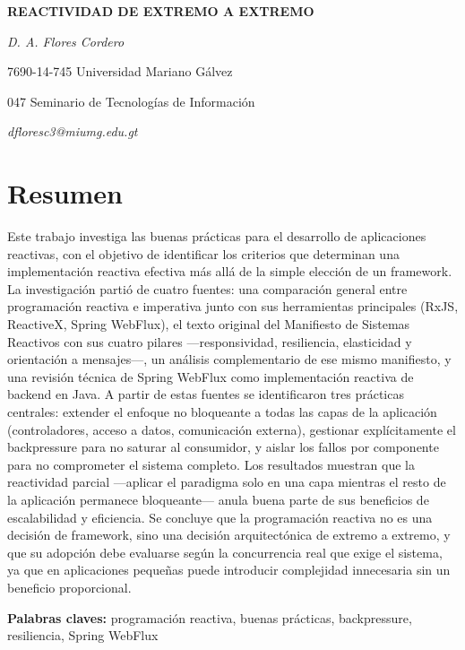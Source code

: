 \documentclass[
  spanish,
  12pt,
  letterpaper,
]{article}
\author{}
\date{}
\begin{document}
\begin{center}

\textbf{REACTIVIDAD DE EXTREMO A EXTREMO}

\emph{D. A. Flores Cordero}

7690-14-745 Universidad Mariano Gálvez

047 Seminario de Tecnologías de Información

\emph{dfloresc3@miumg.edu.gt}

\end{center}

\section{Resumen}\label{resumen}

Este trabajo investiga las buenas prácticas para el desarrollo de
aplicaciones reactivas, con el objetivo de identificar los criterios que
determinan una implementación reactiva efectiva más allá de la simple
elección de un framework. La investigación partió de cuatro fuentes: una
comparación general entre programación reactiva e imperativa junto con
sus herramientas principales (RxJS, ReactiveX, Spring WebFlux), el texto
original del Manifiesto de Sistemas Reactivos con sus cuatro pilares
---responsividad, resiliencia, elasticidad y orientación a mensajes---,
un análisis complementario de ese mismo manifiesto, y una revisión
técnica de Spring WebFlux como implementación reactiva de backend en
Java. A partir de estas fuentes se identificaron tres prácticas
centrales: extender el enfoque no bloqueante a todas las capas de la
aplicación (controladores, acceso a datos, comunicación externa),
gestionar explícitamente el backpressure para no saturar al consumidor,
y aislar los fallos por componente para no comprometer el sistema
completo. Los resultados muestran que la reactividad parcial ---aplicar
el paradigma solo en una capa mientras el resto de la aplicación
permanece bloqueante--- anula buena parte de sus beneficios de
escalabilidad y eficiencia. Se concluye que la programación reactiva no
es una decisión de framework, sino una decisión arquitectónica de
extremo a extremo, y que su adopción debe evaluarse según la
concurrencia real que exige el sistema, ya que en aplicaciones pequeñas
puede introducir complejidad innecesaria sin un beneficio proporcional.

\textbf{Palabras claves:} programación reactiva, buenas prácticas,
backpressure, resiliencia, Spring WebFlux
\end{document}
